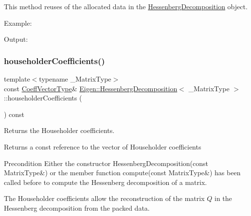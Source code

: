 This method reuses of the allocated data in the \mbox{\hyperlink{class_eigen_1_1_hessenberg_decomposition}{Hessenberg\+Decomposition}} object.

Example\+: 
\begin{DoxyCodeInclude}{0}
\end{DoxyCodeInclude}
 Output\+: 
\begin{DoxyVerbInclude}
\end{DoxyVerbInclude}
 \mbox{\label{class_eigen_1_1_hessenberg_decomposition_a65fa81ce79d956baa59a30a6d82f8a84}} 
\subsubsection{\texorpdfstring{householderCoefficients()}{householderCoefficients()}}
{\footnotesize\ttfamily template$<$typename \+\_\+\+Matrix\+Type$>$ \\
const \mbox{\hyperlink{class_eigen_1_1_hessenberg_decomposition_a567f99f3770365777b67bf9832b6fac1}{Coeff\+Vector\+Type}}\& \mbox{\hyperlink{class_eigen_1_1_hessenberg_decomposition}{Eigen\+::\+Hessenberg\+Decomposition}}$<$ \+\_\+\+Matrix\+Type $>$\+::householder\+Coefficients (\begin{DoxyParamCaption}{ }\end{DoxyParamCaption}) const\hspace{0.3cm}{\ttfamily [inline]}}



Returns the Householder coefficients. 

\begin{DoxyReturn}{Returns}
a const reference to the vector of Householder coefficients
\end{DoxyReturn}
\begin{DoxyPrecond}{Precondition}
Either the constructor Hessenberg\+Decomposition(const Matrix\+Type\&) or the member function compute(const Matrix\+Type\&) has been called before to compute the Hessenberg decomposition of a matrix.
\end{DoxyPrecond}
The Householder coefficients allow the reconstruction of the matrix $ Q $ in the Hessenberg decomposition from the packed data.


